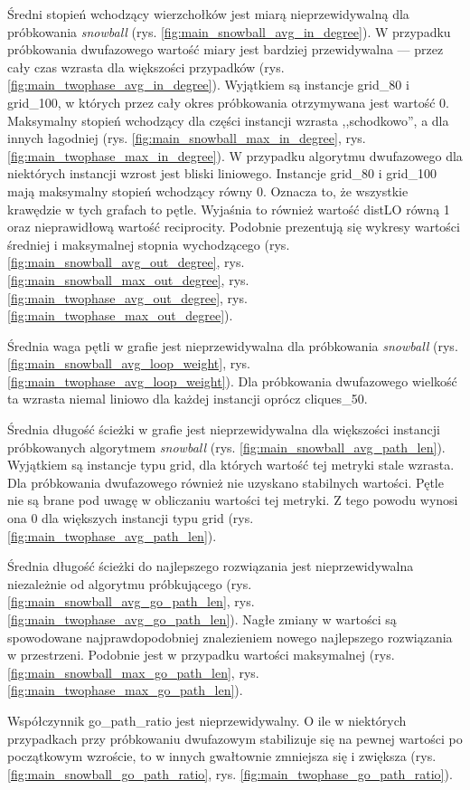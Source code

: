 Średni stopień wchodzący wierzchołków jest miarą nieprzewidywalną dla próbkowania \textit{snowball} (rys. \ref{fig:main_snowball_avg_in_degree}).
W przypadku próbkowania dwufazowego wartość miary jest bardziej przewidywalna --- przez cały czas wzrasta dla większości przypadków (rys. \ref{fig:main_twophase_avg_in_degree}).
Wyjątkiem są instancje grid\_80 i grid\_100, w których przez cały okres próbkowania otrzymywana jest wartość 0.
Maksymalny stopień wchodzący dla części instancji wzrasta ,,schodkowo'', a dla innych łagodniej (rys. \ref{fig:main_snowball_max_in_degree}, rys. \ref{fig:main_twophase_max_in_degree}).
W przypadku algorytmu dwufazowego dla niektórych instancji wzrost jest bliski liniowego.
Instancje grid\_80 i grid\_100 mają maksymalny stopień wchodzący równy 0.
Oznacza to, że wszystkie krawędzie w tych grafach to pętle. Wyjaśnia to również wartość distLO równą 1 oraz nieprawidłową wartość reciprocity.
Podobnie prezentują się wykresy wartości średniej i maksymalnej stopnia wychodzącego
(rys. \ref{fig:main_snowball_avg_out_degree}, rys. \ref{fig:main_snowball_max_out_degree}, rys. \ref{fig:main_twophase_avg_out_degree}, rys. \ref{fig:main_twophase_max_out_degree}).

Średnia waga pętli w grafie jest nieprzewidywalna dla próbkowania \textit{snowball} (rys. \ref{fig:main_snowball_avg_loop_weight}, rys. \ref{fig:main_twophase_avg_loop_weight}).
Dla próbkowania dwufazowego wielkość ta wzrasta niemal liniowo dla każdej instancji oprócz cliques\_50.

Średnia długość ścieżki w grafie jest nieprzewidywalna dla większości instancji próbkowanych algorytmem \textit{snowball} (rys. \ref{fig:main_snowball_avg_path_len}).
Wyjątkiem są instancje typu grid, dla których wartość tej metryki stale wzrasta.
Dla próbkowania dwufazowego również nie uzyskano stabilnych wartości.
Pętle nie są brane pod uwagę w obliczaniu wartości tej metryki. Z tego powodu wynosi ona 0 dla większych instancji typu grid (rys. \ref{fig:main_twophase_avg_path_len}).

Średnia długość ścieżki do najlepszego rozwiązania jest nieprzewidywalna niezależnie od algorytmu próbkującego (rys. \ref{fig:main_snowball_avg_go_path_len}, rys. \ref{fig:main_twophase_avg_go_path_len}).
Nagłe zmiany w wartości są spowodowane najprawdopodobniej znalezieniem nowego najlepszego rozwiązania w przestrzeni.
Podobnie jest w przypadku wartości maksymalnej (rys. \ref{fig:main_snowball_max_go_path_len}, rys. \ref{fig:main_twophase_max_go_path_len}).

Współczynnik go\_path\_ratio jest nieprzewidywalny. O ile w niektórych przypadkach przy próbkowaniu dwufazowym stabilizuje się na pewnej wartości
po początkowym wzroście, to w innych gwałtownie zmniejsza się i zwiększa (rys. \ref{fig:main_snowball_go_path_ratio}, rys. \ref{fig:main_twophase_go_path_ratio}).

